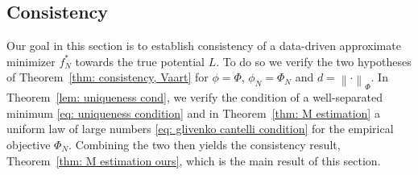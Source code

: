 \documentclass{amsart}
\theoremstyle{definition}
\newcommand{\norm}[1]{\left\|#1\right\|}
\begin{document}
\subsection{Consistency}
Our goal in this section is to establish consistency of a data-driven
approximate minimizer $f_N^*$ towards the true potential $L$. To do so we
verify the two hypotheses of Theorem~\ref{thm: consistency, Vaart} for
$\phi = \Phi$, $\phi_N = \Phi_N$ and $d = \norm{\cdot}_\Phi$.  
In Theorem~\ref{lem: uniqueness cond}, we verify the condition of a well-separated minimum \eqref{eq: uniqueness condition} and in Theorem~\ref{thm: M estimation} a uniform law of large numbers \eqref{eq: glivenko cantelli condition} for the empirical objective
$\Phi_N$. Combining the two then yields
the consistency result, Theorem~\ref{thm: M estimation ours}, which is the
main result of this section.
\end{document}
